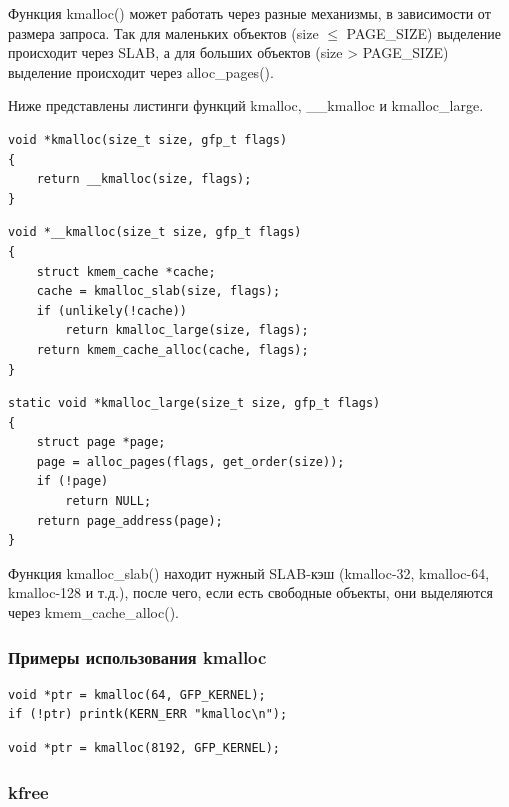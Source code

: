 Функция kmalloc() может работать через разные механизмы, в зависимости от размера запроса.
Так для маленьких объектов (size $\leq$ PAGE\_SIZE) выделение происходит через SLAB, а для больших объектов (size > PAGE\_SIZE) выделение происходит через alloc\_pages().

Ниже представлены листинги функций kmalloc, \_\_kmalloc и kmalloc\_large.

\begin{lstlisting}[caption={kmalloc}]
void *kmalloc(size_t size, gfp_t flags)
{
    return __kmalloc(size, flags);
}
\end{lstlisting}

\begin{lstlisting}[caption={\_\_kmalloc}]
void *__kmalloc(size_t size, gfp_t flags)
{
    struct kmem_cache *cache;
    cache = kmalloc_slab(size, flags);
    if (unlikely(!cache))
        return kmalloc_large(size, flags);
    return kmem_cache_alloc(cache, flags);
}
\end{lstlisting}

\begin{lstlisting}[caption={kmalloc\_large}]
static void *kmalloc_large(size_t size, gfp_t flags)
{
    struct page *page;
    page = alloc_pages(flags, get_order(size));
    if (!page)
        return NULL;
    return page_address(page);
}
\end{lstlisting}

Функция kmalloc\_slab() находит нужный SLAB-кэш (kmalloc-32, kmalloc-64, kmalloc-128 и т.д.), после чего, если есть свободные объекты, они выделяются через kmem\_cache\_alloc().

\subsubsection*{Примеры использования kmalloc}

\begin{lstlisting}[caption={Выделение памяти в SLAB-кэше}]
void *ptr = kmalloc(64, GFP_KERNEL);
if (!ptr) printk(KERN_ERR "kmalloc\n");
\end{lstlisting}

\begin{lstlisting}[caption={Выделение памяти через alloc\_pages}]
void *ptr = kmalloc(8192, GFP_KERNEL);
\end{lstlisting}

\subsubsection{kfree}

